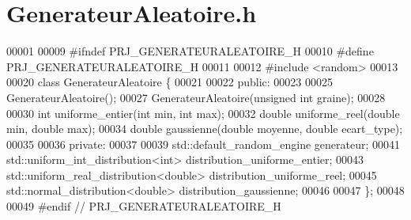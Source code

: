 \section{Generateur\+Aleatoire.\+h}
\label{_generateur_aleatoire_8h_source}

\begin{DoxyCode}
00001 
00009 \textcolor{preprocessor}{#ifndef PRJ\_GENERATEURALEATOIRE\_H}
00010 \textcolor{preprocessor}{#define PRJ\_GENERATEURALEATOIRE\_H}
00011 
00012 \textcolor{preprocessor}{#include <random>}
00013 
00020 \textcolor{keyword}{class }GenerateurAleatoire \{
00021     
00022     \textcolor{keyword}{public}:
00023     
00025     GenerateurAleatoire();
00027     GenerateurAleatoire(\textcolor{keywordtype}{unsigned} \textcolor{keywordtype}{int} graine);
00028     
00030     \textcolor{keywordtype}{int} uniforme_entier(\textcolor{keywordtype}{int} min, \textcolor{keywordtype}{int} max);
00032     \textcolor{keywordtype}{double} uniforme_reel(\textcolor{keywordtype}{double} min, \textcolor{keywordtype}{double} max);
00034     \textcolor{keywordtype}{double} gaussienne(\textcolor{keywordtype}{double} moyenne, \textcolor{keywordtype}{double} ecart\_type);
00035     
00036     \textcolor{keyword}{private}:
00037     
00039     std::default\_random\_engine generateur;
00041     std::uniform\_int\_distribution<int> distribution\_uniforme\_entier;
00043     std::uniform\_real\_distribution<double> distribution\_uniforme\_reel;
00045     std::normal\_distribution<double> distribution\_gaussienne;
00046   
00047 \};
00048 
00049 \textcolor{preprocessor}{#endif // PRJ\_GENERATEURALEATOIRE\_H}
\end{DoxyCode}
